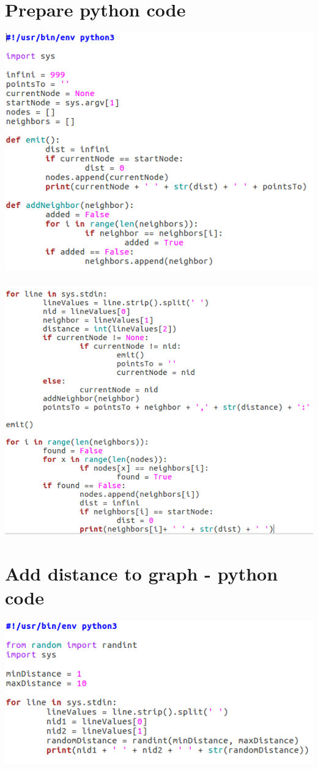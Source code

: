 \documentclass[english]{article}
\begin{document}
\section{Prepare python code}
\includegraphics[scale=0.7]{img/hadoop-prepare-1.png}
$ $\\
\includegraphics[scale=0.7]{img/hadoop-prepare-2.png}
\section{Add distance to graph - python code}
\includegraphics[scale=0.7]{img/hadoop-add-distance-graph.png}
\end{document}
